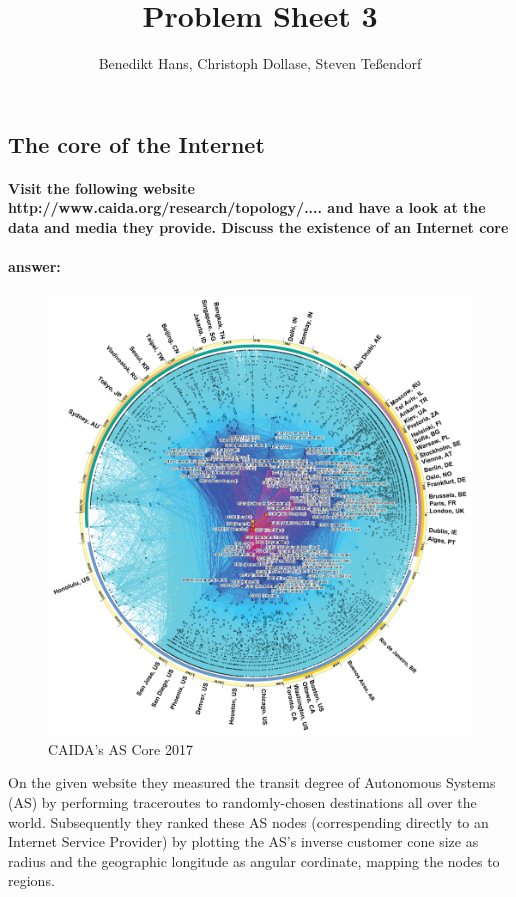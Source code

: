 \documentclass[a4paper,12pt]{article}
\author{Benedikt Hans, Christoph Dollase, Steven Te\ss endorf}
\title{ \textbf{Problem Sheet 3}}
\begin{document}
	 
 \maketitle	 %
 
 \subsection{The core of the Internet}
 \paragraph{Visit the following website http://www.caida.org/research/topology/.... and have a look at the data and media they provide. Discuss the existence of an Internet core}
 \paragraph{answer:}
 
\begin{figure}
 	\includegraphics[width=0.8\linewidth]{ascore2017.png}
 	\caption{CAIDA's AS Core 2017}
 \end{figure}
 On the given website they measured the transit degree of Autonomous Systems (AS) by performing traceroutes to randomly-chosen destinations all over the world.
Subsequently they ranked these AS nodes (correspending directly to an Internet Service Provider) by plotting the AS's inverse customer cone size as radius and the geographic longitude as angular cordinate, mapping the nodes to regions.\\
\end{document}

